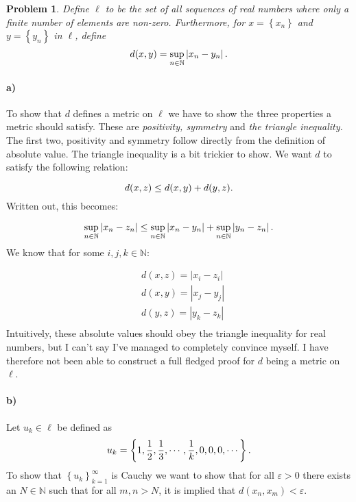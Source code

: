 \documentclass[a4paper]{article}
\newtheorem{prb}{Problem}
\theoremstyle{definition}
\begin{document}
\begin{prb}
  Define $\ell$ to be the set of all sequences of real numbers where only a
  finite number of elements are non-zero. Furthermore, for $x = \left\{ x_n \right\}$ and
  $y = \left\{ y_n \right\}$ in $\ell$, define
  \begin{equation}
    \notag
    d(x, y) = \sup\limits_{n\in\mathbb{N}} \left| x_n - y_n\right|.
  \end{equation}
\end{prb}
\paragraph{a)}

To show that $d$ defines a metric on $\ell$ we have to show the three
properties a metric should satisfy. These are \textit{positivity, symmetry} and
\textit{the triangle inequality.} The first two, positivity and symmetry follow
directly from the definition of absolute value.  The triangle inequality is a
bit trickier to show. We want $d$ to satisfy the following relation:

\begin{equation}
  \notag
  d(x, z) \leq d(x, y) + d(y, z).
\end{equation}
Written out, this becomes:

\begin{equation}
  \notag
  \sup\limits_{n\in\mathbb{N}} \left| x_n - z_n\right| \leq \sup\limits_{n\in\mathbb{N}} \left| x_n - y_n\right| +  \sup\limits_{n\in\mathbb{N}} \left| y_n - z_n\right|.
\end{equation}
We know that for some $i, j, k \in \mathbb{N}$:

\begin{align*}
  \label{eq:}
  &d(x, z) = \left| x_i - z_i \right| \\
  &d(x, y) = \left| x_j - y_j \right| \\
  &d(y, z) = \left| y_k - z_k \right| \\
\end{align*}
Intuitively, these absolute values should obey the triangle inequality for real
numbers, but I can't say I've managed to completely convince myself. I have
therefore not been able to construct a full fledged proof for $d$ being a
metric on $\ell$.

\paragraph{b)}
Let $u_k \in \ell$ be defined as
\begin{equation}
  \notag
  u_k = \left\{ 1, \frac{1}{2}, \frac{1}{3}, \cdots, \frac{1}{k}, 0, 0, 0, \cdots \right\}.
\end{equation}
To show that $\left\{ u_k \right\}_{ k = 1 }^{\infty}$ is Cauchy we want to
show that for all $\varepsilon > 0$ there exists an $N \in \mathbb{N}$ such
that for all $m, n > N$, it is implied that $d\left( x_n, x_m \right) <
\varepsilon$.
\end{document}
